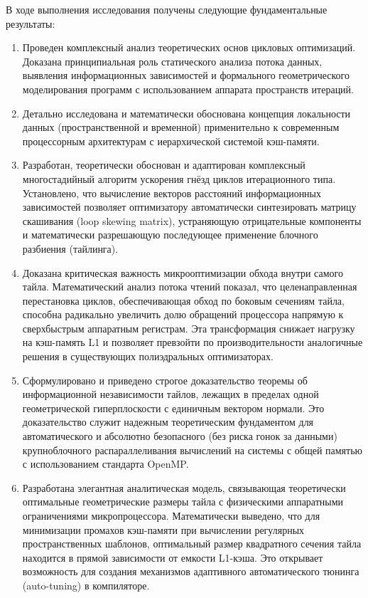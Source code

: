 \documentclass[14pt, russian]{scrartcl}
\begin{document}
В ходе выполнения исследования получены следующие фундаментальные результаты:
\begin{enumerate}
    \item Проведен комплексный анализ теоретических основ цикловых оптимизаций. Доказана принципиальная роль статического анализа потока данных, выявления информационных зависимостей и формального геометрического моделирования программ с использованием аппарата пространств итераций.
    \item Детально исследована и математически обоснована концепция локальности данных (пространственной и временной) применительно к современным процессорным архитектурам с иерархической системой кэш-памяти.
    \item Разработан, теоретически обоснован и адаптирован комплексный многостадийный алгоритм ускорения гнёзд циклов итерационного типа. Установлено, что вычисление векторов расстояний информационных зависимостей позволяет оптимизатору автоматически синтезировать матрицу скашивания (loop skewing matrix), устраняющую отрицательные компоненты и математически разрешающую последующее применение блочного разбиения (тайлинга).
    \item Доказана критическая важность микрооптимизации обхода внутри самого тайла. Математический анализ потока чтений показал, что целенаправленная перестановка циклов, обеспечивающая обход по боковым сечениям тайла, способна радикально увеличить долю обращений процессора напрямую к сверхбыстрым аппаратным регистрам. Эта трансформация снижает нагрузку на кэш-память L1 и позволяет превзойти по производительности аналогичные решения в существующих полиэдральных оптимизаторах.
    \item Сформулировано и приведено строгое доказательство теоремы об информационной независимости тайлов, лежащих в пределах одной геометрической гиперплоскости с единичным вектором нормали. Это доказательство служит надежным теоретическим фундаментом для автоматического и абсолютно безопасного (без риска гонок за данными) крупноблочного распараллеливания вычислений на системы с общей памятью с использованием стандарта OpenMP.
    \item Разработана элегантная аналитическая модель, связывающая теоретически оптимальные геометрические размеры тайла с физическими аппаратными ограничениями микропроцессора. Математически выведено, что для минимизации промахов кэш-памяти при вычислении регулярных пространственных шаблонов, оптимальный размер квадратного сечения тайла находится в прямой зависимости от емкости L1-кэша. Это открывает возможность для создания механизмов адаптивного автоматического тюнинга (auto-tuning) в компиляторе.
\end{enumerate}
\end{document}
